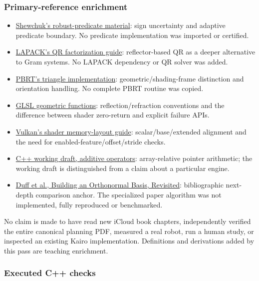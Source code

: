 \subsubsection{Primary-reference enrichment}\label{appendix-a103e7846d21-primary-reference-enrichment-1}

\begin{itemize}
\tightlist
\item
  \href{https://www.cs.cmu.edu/~quake/robust.html}{Shewchuk's robust-predicate material}: sign uncertainty and adaptive predicate boundary. No predicate implementation was imported or certified.
\item
  \href{https://www.netlib.org/lapack/lug/node40.html}{LAPACK's QR factorization guide}: reflector-based QR as a deeper alternative to Gram systems. No LAPACK dependency or QR solver was added.
\item
  \href{https://www.pbr-book.org/4ed/Shapes/Triangle_Meshes}{PBRT's triangle implementation}: geometric/shading-frame distinction and orientation handling. No complete PBRT routine was copied.
\item
  \href{https://registry.khronos.org/OpenGL/specs/gl/GLSLangSpec.4.60.html\#geometric-functions}{GLSL geometric functions}: reflection/refraction conventions and the difference between shader zero-return and explicit failure APIs.
\item
  \href{https://docs.vulkan.org/guide/latest/shader_memory_layout.html}{Vulkan's shader memory-layout guide}: scalar/base/extended alignment and the need for enabled-feature/offset/stride checks.
\item
  \href{https://eel.is/c++draft/expr.add}{C++ working draft, additive operators}: array-relative pointer arithmetic; the working draft is distinguished from a claim about a particular engine.
\item
  \href{https://graphics.pixar.com/library/OrthonormalB/paper.pdf}{Duff et al., Building an Orthonormal Basis, Revisited}: bibliographic next-depth comparison anchor. The specialized paper algorithm was not implemented, fully reproduced or benchmarked.
\end{itemize}

No claim is made to have read new iCloud book chapters, independently verified the entire canonical planning PDF, measured a real robot, run a human study, or inspected an existing Kairo implementation. Definitions and derivations added by this pass are teaching enrichment.

\subsubsection{Executed C++ checks}\label{appendix-a103e7846d21-executed-c-checks}

